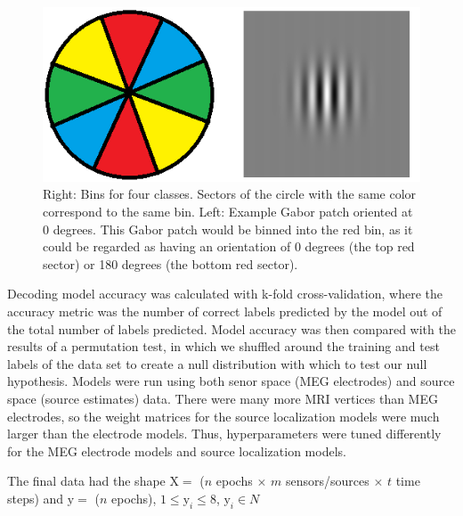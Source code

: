 \documentclass[../main.tex]{subfiles}
\begin{document}
\begin{figure}
    \centering
    \includegraphics{figures/methods/gabor_bins.png}
    \caption{Right: Bins for four classes. Sectors of the circle with the same color correspond to the same bin. Left: Example Gabor patch oriented at 0 degrees. This Gabor patch would be binned into the red bin, as it could be regarded as having an orientation of 0 degrees (the top red sector) or 180 degrees (the bottom red sector).}
    \label{gabor_bins}
\end{figure}

Decoding model accuracy was calculated with k-fold cross-validation, where the accuracy metric was the number of correct labels predicted by the model out of the total number of labels predicted. Model accuracy was then compared with the results of a permutation test, in which we shuffled around the training and test labels of the data set to create a null distribution with which to test our null hypothesis. Models were run using both senor space (MEG electrodes) and source space (source estimates) data. There were many more MRI vertices than MEG electrodes, so the weight matrices for the source localization models were much larger than the electrode models. Thus, hyperparameters were tuned differently for the MEG electrode models and source localization models.

The final data had the shape $\mathrm{X} = $ ($n$ epochs $\times$ $m$ sensors/sources $\times$ $t$ time steps) and $\mathrm{y} = $ ($n$ epochs), $1 \leq \mathrm{y}_i \leq 8$, $\mathrm{y}_i \in N$
\end{document}
